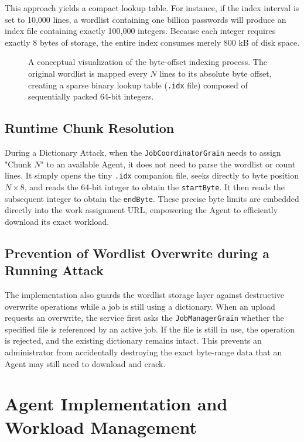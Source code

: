 This approach yields a compact lookup table. For instance, if the index interval is set to 10,000 lines, a wordlist containing one billion passwords will produce an index file containing exactly 100,000 integers. Because each integer requires exactly 8 bytes of storage, the entire index consumes merely 800 kB of disk space.

\begin{figure}[H]
\centering

\caption{A conceptual visualization of the byte-offset indexing process. The original wordlist is mapped every $N$ lines to its absolute byte offset, creating a sparse binary lookup table (\texttt{.idx} file) composed of sequentially packed 64-bit integers.}
\label{fig:wordlist_indexing}
\end{figure}

\subsection{Runtime Chunk Resolution}
During a Dictionary Attack, when the \verb|JobCoordinatorGrain| needs to assign "Chunk $N$" to an available Agent, it does not need to parse the wordlist or count lines. It simply opens the tiny \verb|.idx| companion file, seeks directly to byte position $N \times 8$, and reads the 64-bit integer to obtain the \verb|startByte|. It then reads the subsequent integer to obtain the \verb|endByte|. These precise byte limits are embedded directly into the work assignment URL, empowering the Agent to efficiently download its exact workload.

\subsection{Prevention of Wordlist Overwrite during a Running Attack}

The implementation also guards the wordlist storage layer against destructive overwrite operations while a job is still using a dictionary. When an upload requests an overwrite, the service first asks the \verb|JobManagerGrain| whether the specified file is referenced by an active job. If the file is still in use, the operation is rejected, and the existing dictionary remains intact. This prevents an administrator from accidentally destroying the exact byte-range data that an Agent may still need to download and crack.

\section{Agent Implementation and Workload Management}
\label{sec:Agent_implementation}

